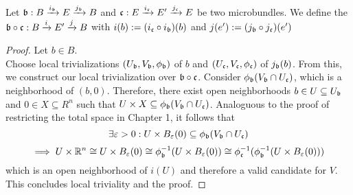 \\ Let $\bundleb:\bundle{B}{E}{i_\bundleb}{j_\bundleb}$ and $\bundlec:\bundle{E}{E'}{i_\bundlec}{j_\bundlec}$ be two microbundles.
We define the  $\bundleb \circ \bundlec:\bundle{B}{E'}{i}{j}$ with $i(b) := (i_\bundlec \circ i_\bundleb)(b)$ and $j(e') := (j_\bundleb \circ j_\bundlec)(e')$
\begin{proof}
Let $b \in B$. \\
Choose local trivializations $(U_\bundleb, V_\bundleb, \phi_\bundleb)$ of $b$ and $(U_\bundlec, V_\bundlec, \phi_\bundlec)$ of $j_\bundleb(b)$.
From this, we construct our local trivialization over $\bundleb \circ \bundlec$.
Consider $\phi_\bundleb(V_\bundleb \cap U_\bundlec)$, which is a neighborhood of $(b, 0)$.
Therefore, there exist open neighborhoods $b \in U \subseteq U_\bundleb$ and $0 \in X \subseteq R^n$ such that $U \times X \subseteq \phi_\bundleb(V_\bundleb \cap U_\bundlec)$.
Analoguous to the proof of restricting the total space in Chapter 1, it follows that
\[ \exists \varepsilon > 0: U \times B_\varepsilon(0) \subseteq \phi_\bundleb(V_\bundleb \cap U_\bundlec) \]
\[ \implies U \times \R^n \cong U \times B_\varepsilon(0) \cong \phi_\bundleb^{-1}(U \times B_\varepsilon(0)) \cong \phi_\bundlec^{-1}(\phi_\bundleb^{-1}(U \times B_\varepsilon(0))) \]
which is an open neighborhood of $i(U)$ and therefore a valid candidate for $V$.
This concludes local triviality and the proof.
\end{proof}
